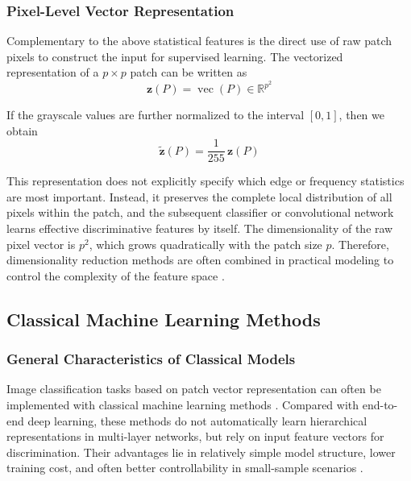 \subsubsection{Pixel-Level Vector Representation}
\par Complementary to the above statistical features is the direct use of raw
patch pixels to construct the input for supervised learning. The vectorized
representation of a $p\times p$ patch can be written as
\begin{equation}
    \mathbf{z}(P)=\operatorname{vec}(P)\in\mathbb{R}^{p^2}
    \label{eq:pixel-vector-basic}
\end{equation}
\par If the grayscale values are further normalized to the interval $[0,1]$,
then we obtain
\begin{equation}
    \tilde{\mathbf{z}}(P)=\frac{1}{255}\,\mathbf{z}(P)
    \label{eq:pixel-vector-normalized}
\end{equation}
\par This representation does not explicitly specify which edge or frequency
statistics are most important. Instead, it preserves the complete local
distribution of all pixels within the patch, and the subsequent classifier or
convolutional network learns effective discriminative features by itself. The
dimensionality of the raw pixel vector is $p^2$, which grows quadratically with
the patch size $p$. Therefore, dimensionality reduction methods are often
combined in practical modeling to control the complexity of the feature space
\cite[pp.~651--708]{murphy2022pml}.

\subsection{Classical Machine Learning Methods}
\subsubsection{General Characteristics of Classical Models}
\par Image classification tasks based on patch vector representation can often
be implemented with classical machine learning methods
\cite[pp.~321--618]{murphy2022pml}. Compared with end-to-end deep learning,
these methods do not automatically learn hierarchical representations in
multi-layer networks, but rely on input feature vectors for discrimination.
Their advantages lie in relatively simple model structure, lower training cost,
and often better controllability in small-sample scenarios
\cite{cortes1995support,breiman2001random}.

